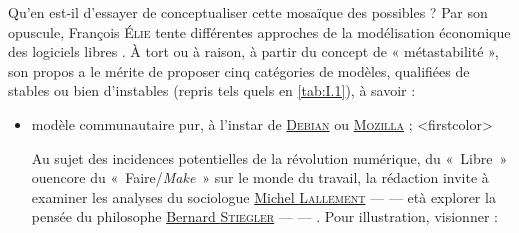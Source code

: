 Qu'en est-il d'essayer de conceptualiser cette mosaïque des possi\-bles ? Par son opuscule, François \textsc{Élie} tente différentes approches de la modélisation économique des logiciels libres \parencite{Elie:2009}. À tort ou à raison, à partir du concept de « métastabilité », son propos a le mérite de proposer cinq catégories de modèles, qualifiées de stables ou bien d'instables (repris tels quels en \cref{tab:I.1}), à savoir :
\begin{itemize}
	\item modèle communautaire pur, à l'instar de \href{https://www.debian.org/index.fr.html}{\textsc{Debian}} ou \href{https://foundation.mozilla.org/fr/}{\textsc{Mozilla}} ;
\caution[t]<firstcolor>{%
Au sujet des incidences potentielles de la révolution numérique, du «~Libre~» ou\linebreak encore du «~Faire/\textit{Make}~» sur le monde du travail, la rédaction invite à examiner les analyses du sociologue \href{./Videos/Chapter01/lallement-age-du-faire-2015.mp4}{Michel \textsc{Lallement}} ---  \parencite{Lallement:2015} --- et\linebreak à explorer la pensée du philosophe \href{./Videos/Chapter01/stiegler-societe-automatique-inria-2014.mp4}{Ber\-nard \textsc{Stiegler}} ---  \parencite{Stiegler:2015b} ---  \parencite{Stiegler:2015a}. Pour illustration, visionner :
}
\end{itemize}

